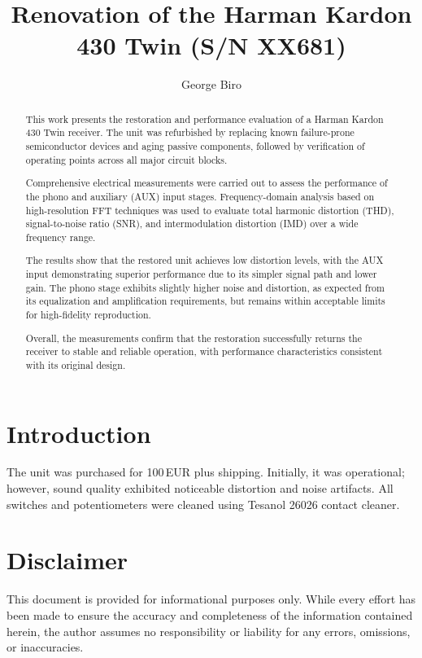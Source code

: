 \documentclass[]{article}
\title{Renovation of the Harman Kardon 430 Twin (S/N XX681)}
\author{George Biro}
\begin{document}
\maketitle

\begin{abstract}
This work presents the restoration and performance evaluation of a Harman Kardon 430 Twin receiver. The unit was refurbished by replacing known failure-prone semiconductor devices and aging passive components, followed by verification of operating points across all major circuit blocks.

Comprehensive electrical measurements were carried out to assess the performance of the phono and auxiliary (AUX) input stages. Frequency-domain analysis based on high-resolution FFT techniques was used to evaluate total harmonic distortion (THD), signal-to-noise ratio (SNR), and intermodulation distortion (IMD) over a wide frequency range.

The results show that the restored unit achieves low distortion levels, with the AUX input demonstrating superior performance due to its simpler signal path and lower gain. The phono stage exhibits slightly higher noise and distortion, as expected from its equalization and amplification requirements, but remains within acceptable limits for high-fidelity reproduction.

Overall, the measurements confirm that the restoration successfully returns the receiver to stable and reliable operation, with performance characteristics consistent with its original design.

\end{abstract}

\section{Introduction}

The unit was purchased for 100\,EUR plus shipping.  
Initially, it was operational; however, sound quality exhibited noticeable distortion and noise artifacts.
All switches and potentiometers were cleaned using Tesanol 26026 contact cleaner.

\section{Disclaimer}

This document is provided for informational purposes only. While every effort has been made to ensure the accuracy and completeness of the information contained herein, the author assumes no responsibility or liability for any errors, omissions, or inaccuracies.
\end{document}
